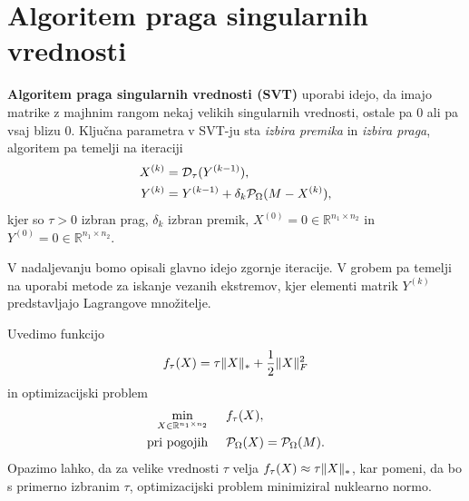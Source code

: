 \section{Algoritem praga singularnih vrednosti}\label{2807-1441}
\textbf{Algoritem praga singularnih vrednosti (SVT)} \cite{CCS} uporabi idejo, da imajo matrike z majhnim rangom nekaj velikih singularnih vrednosti, ostale pa 0 ali pa vsaj blizu 0. Ključna parametra v SVT-ju sta \textit{izbira premika} in \textit{izbira praga},  
algoritem pa temelji na iteraciji
\begin{align}
\label{2407-1910}
        X^{(k)} &= \mathcal{D}_\tau(Y^{(k-1)}), \\
        Y^{(k)} &= Y^{(k-1)} + \delta_k \mathcal{P}_\Omega(M - X^{(k)}), 
\end{align}
kjer so $\tau > 0$ izbran prag, $\delta_k$ izbran premik, $X^{(0)} = 0 \in \mathbb{R}^{n_1 \times n_2}$ in
$Y^{(0)} = 0 \in \mathbb{R}^{n_1 \times n_2}$. \cite{CCS}

V nadaljevanju bomo opisali glavno idejo zgornje iteracije. V grobem pa temelji na uporabi metode za iskanje vezanih ekstremov, kjer elementi matrik $Y^{(k)}$ predstavljajo Lagrangove množitelje. 

Uvedimo funkcijo 
\begin{align}
    \label{1007-2007}
    f_\tau(X) = \tau\lVert X\rVert_* + \frac{1}{2}\lVert X\rVert_F^2
\end{align}
in optimizacijski problem
\begin{align}
\label{2706-0957}
\begin{split}
    \min_{X\in \mathbb R^{n_1\times n_2}} & \hspace{0.5cm} f_\tau(X), \\
    \textrm{pri pogojih} & \hspace{0.5cm} \mathcal{P}_\Omega(X) = \mathcal{P}_\Omega(M).
\end{split}
\end{align}
Opazimo lahko, da za velike vrednosti $\tau$ velja $f_\tau(X) \approx \tau\lVert X\rVert_*$, kar pomeni, da bo s primerno izbranim $\tau$, optimizacijski problem minimiziral nuklearno normo.

